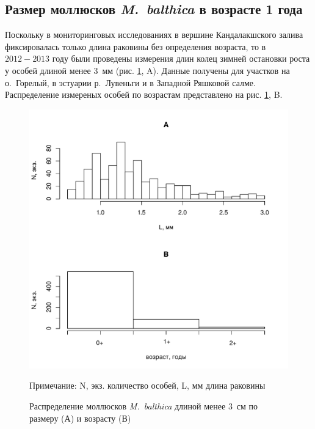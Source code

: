 
	\subsection{Размер моллюсков {\it M.~balthica} в возрасте 1 года}

Поскольку в мониторинговых исследованиях в вершине Кандалакшского залива фиксировалась только длина раковины без определения возраста, то в $2012 - 2013$ году были проведены  измерения длин колец зимней остановки роста у особей длиной менее $3$~мм (рис. \ref{ris:vozrast_menee_3mm}, A). 
Данные получены для участков на о.~Горелый, в эстуарии р.~Лувеньги и в Западной Ряшковой салме. 
Распределение измереных особей по возрастам представлено на рис. \ref{ris:vozrast_menee_3mm}, B.
	\begin{figure}[hbp]
		\includegraphics{../White_Sea/growth_young/hist_obili_po_godam1.pdf}
	\caption{Распределение моллюсков {\it M.~balthica} длиной менее $3$~см по размеру (А) и возрасту (В)}
	\label{ris:vozrast_menee_3mm}
	{\footnotesize Примечание: N, экз. \textemdash количество особей, L, мм \textemdash длина раковины}
	\end{figure}

